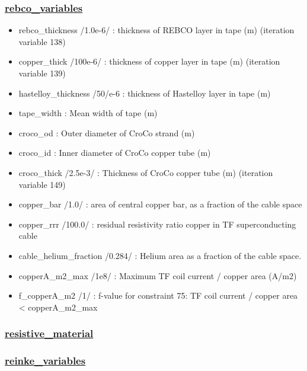 \documentclass[]{article}
\providecommand{\tightlist}{%
  \setlength{\itemsep}{0pt}\setlength{\parskip}{0pt}}
\begin{document}
\subsubsection{\texorpdfstring{\href{rebco_variables.html}{rebco\_variables}}{rebco\_variables}}\label{rebco_variables}

\begin{itemize}
\tightlist
\item
  rebco\_thickness /1.0e-6/ : thickness of REBCO layer in tape (m)
  (iteration variable 138)
\item
  copper\_thick /100e-6/ : thickness of copper layer in tape (m)
  (iteration variable 139)
\item
  hastelloy\_thickness /50/e-6 : thickness of Hastelloy layer in tape
  (m)
\item
  tape\_width : Mean width of tape (m)
\item
  croco\_od : Outer diameter of CroCo strand (m)
\item
  croco\_id : Inner diameter of CroCo copper tube (m)
\item
  croco\_thick /2.5e-3/ : Thickness of CroCo copper tube (m) (iteration
  variable 149)
\item
  copper\_bar /1.0/ : area of central copper bar, as a fraction of the
  cable space
\item
  copper\_rrr /100.0/ : residual resistivity ratio copper in TF
  superconducting cable
\item
  cable\_helium\_fraction /0.284/ : Helium area as a fraction of the
  cable space.
\item
  copperA\_m2\_max /1e8/ : Maximum TF coil current / copper area (A/m2)
\item
  f\_copperA\_m2 /1/ : f-value for constraint 75: TF coil current /
  copper area \textless{} copperA\_m2\_max
\end{itemize}

\subsubsection{\texorpdfstring{\href{resistive_material.html}{resistive\_material}}{resistive\_material}}\label{resistive_material}

\subsubsection{\texorpdfstring{\href{reinke_variables.html}{reinke\_variables}}{reinke\_variables}}\label{reinke_variables}
\end{document}
